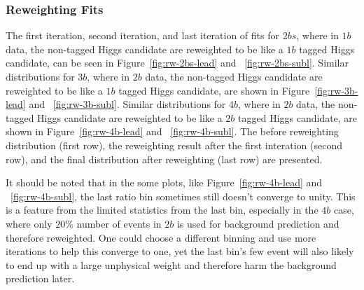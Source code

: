 \subsubsection{Reweighting Fits}
\label{sec:boosted-Reweight-Fit}
The first iteration, second iteration, and last iteration of fits for $2bs$, where in $1b$ data, the non-tagged Higgs candidate are reweighted to be like a $1b$ tagged Higgs candidate, can be seen in Figure~\ref{fig:rw-2bs-lead} and ~\ref{fig:rw-2bs-subl}. Similar distributions for $3b$, where in $2b$ data, the non-tagged Higgs candidate are reweighted to be like a $1b$ tagged Higgs candidate, are shown in Figure~\ref{fig:rw-3b-lead} and ~\ref{fig:rw-3b-subl}. Similar distributions for $4b$, where in $2b$ data, the non-tagged Higgs candidate are reweighted to be like a $2b$ tagged Higgs candidate, are shown in Figure~\ref{fig:rw-4b-lead} and ~\ref{fig:rw-4b-subl}. The before reweighting distribution (first row), the reweighting result after the first interation (second row), and the final distribution after reweighting (last row) are presented.

It should be noted that in the some plots, like Figure~\ref{fig:rw-4b-lead} and ~\ref{fig:rw-4b-subl}, the last ratio bin sometimes still doesn't converge to unity. This is a feature from the limited statistics from the last bin, especially in the $4b$ case, where only $20\%$ number of events in $2b$ is used for background prediction and therefore reweighted. One could choose a different binning and use more iterations to help this converge to one, yet the last bin's few event will also likely to end up with a large unphysical weight and therefore harm the background prediction later.

